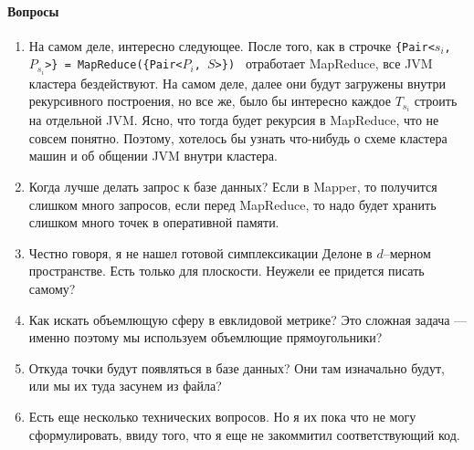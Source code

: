 \documentclass{article}
\begin{document}
    \paragraph{Вопросы}
        \begin{enumerate}
            \item На самом деле, интересно следующее. После того, как в строчке {\tt \{Pair<$s_i$, $P_{s_i}$>\} = MapReduce(\{Pair<$P_i$, $S$>\}) } отработает MapReduce, все JVM кластера бездействуют. На самом деле, далее они будут загружены внутри рекурсивного построения, но все же, было бы интересно каждое $T_{s_i}$ строить на отдельной JVM. Ясно, что тогда будет рекурсия в MapReduce, что не совсем понятно. Поэтому, хотелось бы узнать что-нибудь о схеме кластера машин и об общении JVM внутри кластера.
            \item Когда лучше делать запрос к базе данных? Если в Mapper, то получится слишком много запросов, если перед MapReduce, то надо будет хранить слишком много точек в оперативной памяти.
            \item Честно говоря, я не нашел готовой симплексикации Делоне в $d$--мерном пространстве. Есть только для плоскости. Неужели ее придется писать самому?
            \item Как искать объемлющую сферу в евклидовой метрике? Это сложная задача --- именно поэтому мы используем объемлющие прямоугольники?
            \item Откуда точки будут появляться в базе данных? Они там изначально будут, или мы их туда засунем из файла? 
            \item Есть еще несколько технических вопросов. Но я их пока что не могу сформулировать, ввиду того, что я еще не закоммитил соответствующий код.
             
        \end{enumerate}
	
	
	
	
\end{document}

